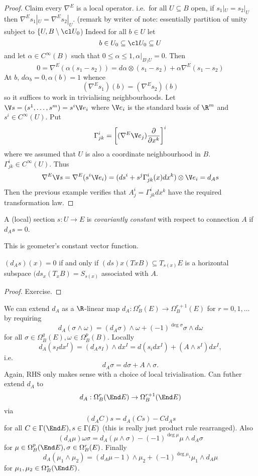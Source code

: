 \documentclass[a4paper]{article}
\newcommand{\w}{\wedge}
\begin{document}
\begin{proof}
  Claim every \(\nabla^E\) is a local operator. i.e.\ for all \(U \subseteq B\) open, if \(s_1|_U = s_2|_U\) then \(\nabla^E s_1|_U = \nabla^E s_2|_U\). (remark by writer of note: essentially partition of unity subject to \(\{U, B \setminus \cl U_0\))
  Indeed for all \(b \in U\) let
  \[
    b \in U_0 \subseteq \cl U_0 \subseteq U
  \]
  and let \(\alpha \in C^\infty(B)\) such that \(0 \leq \alpha \leq 1, \alpha|_{B \setminus U} = 0\). Then
  \[
    0 = \nabla^E (\alpha(s_1 - s_2))
    = d\alpha \otimes (s_1 - s_2)
    + \alpha \nabla^E(s_1 - s_2)
  \]
  At \(b\), \(d\alpha_b = 0, \alpha(b) = 1\) whence
  \[
    (\nabla^E s_1)(b) = (\nabla^E s_2)(b)
  \]
  so it suffices to work in trivialising neighbourhoods. Let \(\V s = (s^1, \dots, s^m) = s^i \V e_i\) where \(\V e_i\) is the standard basis of \(\R^m\) and \(s^i \in C^\infty(U)\). Put
  \[
    \Gamma_{jk}^i = \left[(\nabla^E \V e_j) \frac{\partial  }{\partial x^k} \right]^i
  \]
  where we assumed that \(U\) is also a coordinate neighbourhood in \(B\). \(\Gamma_{jk}^i \in C^\infty(U)\). Thus
  \[
    \nabla^E \V s = \nabla^E (s^i \V e_i)
    = (ds^i + s^j \Gamma^i_{jk}(x) dx^k) \otimes \V e_i
    = d_As
  \]
  Then the previous example verifies that \(A_j^i = \Gamma_{jk}^i dx^k\) have the required transformation law.
\end{proof}

\begin{definition}
  A (local) section \(s: U \to E\) is \emph{covariantly constant} with respect to connection \(A\) if \(d_As = 0\).
\end{definition}

This is geometer's constant vector function.

\begin{proposition}
  \((d_As)(x) = 0\) if and only if \((ds)x(TxB) \subseteq T_{s(x)}E\) is a horizontal subspace \((ds_x (T_xB) = S_{s(x)}\) associated with \(A\).
\end{proposition}

\begin{proof}
  Exercise.
\end{proof}

We can extend \(d_A\) as a \(\R\)-linear map \(d_A: \Omega_B^r(E) \to \Omega_B^{r + 1}(E)\) for \(r = 0, 1, \dots\) by requiring
\[
  d_A(\sigma \w \omega) = (d_A\sigma) \w \omega + (-1)^{\deg \sigma} \sigma \w d\omega
\]
for all \(\sigma \in \Omega_B^q(E), \omega \in \Omega_B^p(B)\). Locally
\[
  d_A(s_I dx^I) = (d_A s_I) \w dx^I = d(s_i dx^I) + (A \w s^I) dx^I,
\]
i.e.\
\[
  d_A\sigma = d\sigma + A \w \sigma.
\]
Again, RHS only makes sense with a choice of local trivialisation. Can futher extend \(d_A\) to
\[
  d_A: \Omega_B^r(\End E) \to \Omega_B^{r + 1}(\End E)
\]
via
\[
  (d_AC)s = d_A(Cs) - Cd_As
\]
for all \(C \in \Gamma(\End E),  s \in \Gamma(E)\) (this is really just product rule rearranged). Also
\[
  (d_A\mu) \omega \sigma = d_A(\mu \w \sigma) - (-1)^{\deg \mu} \mu \w d_A\sigma
\]
for \(\mu \in \Omega_B^p(\End E), \sigma \in \Omega_B^r(E)\). Finally
\[
  d_A(\mu_1 \w \mu_2) = (d_A\mu-1) \w \mu_2 + (-1)^{\deg \mu_1} \mu_1 \w d_A \mu
\]
for \(\mu_1, \mu_2 \in \Omega_B^*(\End E)\).
\end{document}
